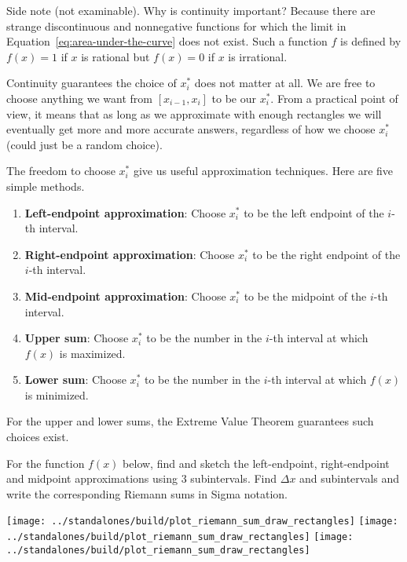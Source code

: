 \documentclass[../main.tex]{subfiles}
\begin{document}
  Side note (not examinable). Why is continuity important? Because there are strange discontinuous and nonnegative functions for which the limit in Equation~\eqref{eq:area-under-the-curve} does not exist.  Such a function \(f\) is defined by \(f(x) = 1\) if \(x\) is rational but \(f(x) = 0\) if \(x\) is irrational. 
 
  \clearpage
  Continuity guarantees the choice of \(x_{i}^{*}\) does not matter at all. We are free to choose anything we want from \([x_{i-1}, x_{i}]\) to be our \(x_{i}^{*}\). From a practical point of view, it means that as long as we approximate with enough rectangles we will eventually get more and more accurate answers, regardless of how we choose \(x_{i}^{*}\) (could just be a random choice).

  The freedom to choose \(x_{i}^{*}\) give us useful approximation techniques. Here are five simple methods.
  \begin{enumerate}
    \item \textbf{Left-endpoint approximation}: Choose \(x_{i}^{*}\) to be the left endpoint of the \(i\)-th interval.
    \item \textbf{Right-endpoint approximation}: Choose \(x_{i}^{*}\) to be the right endpoint of the \(i\)-th interval.
    \item \textbf{Mid-endpoint approximation}: Choose \(x_{i}^{*}\) to be the midpoint of the \(i\)-th interval.
    \item \textbf{Upper sum}: Choose \(x_{i}^{*}\) to be the number in the \(i\)-th interval at which \(f(x)\) is maximized.
    \item \textbf{Lower sum}: Choose \(x_{i}^{*}\) to be the number in the \(i\)-th interval at which \(f(x)\) is minimized.
  \end{enumerate}
  For the upper and lower sums, the Extreme Value Theorem guarantees such choices exist.

  \begin{example}
    For the function \(f(x)\) below, find and sketch the left-endpoint, right-endpoint and midpoint approximations using \(3\) subintervals. Find \(\Delta x\) and subintervals and write the corresponding Riemann sums in Sigma notation.

    \hfill{}
    \texttt{[image: ../standalones/build/plot\_riemann\_sum\_draw\_rectangles]}
    \hfill{}
    \texttt{[image: ../standalones/build/plot\_riemann\_sum\_draw\_rectangles]}
    \hfill{}
    \texttt{[image: ../standalones/build/plot\_riemann\_sum\_draw\_rectangles]}
    \hfill{}

  \end{example}
  \clearpage
\end{document}
